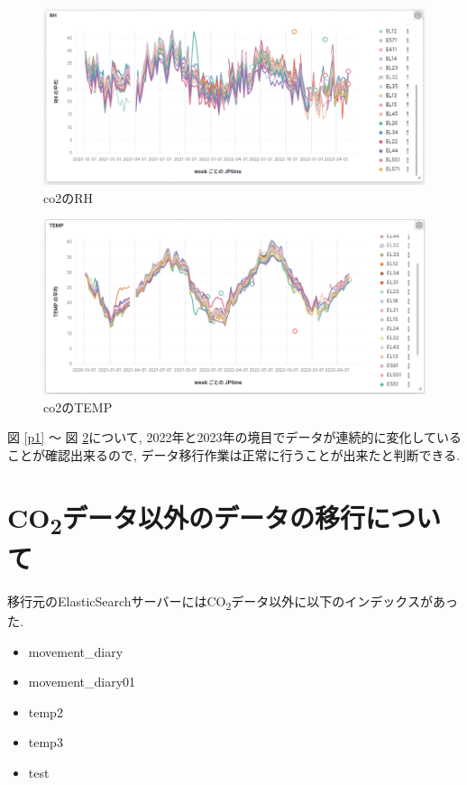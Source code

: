\documentclass[a4j,12pt,]{jarticle}
\begin{document}
\begin{figure}[H]
  \begin{center}
    \includegraphics[width=160mm]{rh.png}
    \caption{co2のRH}
    \label{p2}
  \end{center}
\end{figure}

\begin{figure}[H]
  \begin{center}
    \includegraphics[width=160mm]{temp.png}
    \caption{co2のTEMP}
    \label{p3}
  \end{center}
\end{figure}

図 \ref{p1} 〜 図 \ref{p3}について, 2022年と2023年の境目でデータが連続的に変化していることが確認出来るので, データ移行作業は正常に行うことが出来たと判断できる.

\section{CO\textsubscript{2}データ以外のデータの移行について}

移行元のElasticSearchサーバーにはCO\textsubscript{2}データ以外に以下のインデックスがあった.

\begin{itemize}
  \item movement\_diary
  \item movement\_diary01
  \item temp2
  \item temp3
  \item test
\end{itemize}
\end{document}
